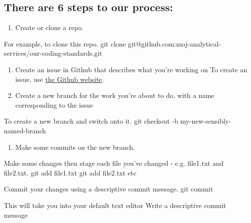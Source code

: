 \documentclass[]{book}
\newenvironment{Shaded}{\begin{snugshade}}{\end{snugshade}}
\newcommand{\ExtensionTok}[1]{#1}
\newcommand{\FunctionTok}[1]{\textcolor[rgb]{0.00,0.00,0.00}{#1}}
\newcommand{\NormalTok}[1]{#1}
\newcommand{\StringTok}[1]{\textcolor[rgb]{0.31,0.60,0.02}{#1}}
\providecommand{\tightlist}{%
  \setlength{\itemsep}{0pt}\setlength{\parskip}{0pt}}
\begin{document}
\hypertarget{there-are-6-steps-to-our-process}{%
\subsection*{There are 6 steps to our process:}\label{there-are-6-steps-to-our-process}}

\begin{enumerate}
\def\labelenumi{\arabic{enumi}.}
\tightlist
\item
  Create or clone a repo.
\end{enumerate}

\begin{Shaded}
\begin{Highlighting}[]
\ExtensionTok{For}\NormalTok{ example, to clone this repo.}
\FunctionTok{git}\NormalTok{ clone git@github.com:moj-analytical-services/our-coding-standards.git}
\end{Highlighting}
\end{Shaded}

\begin{enumerate}
\def\labelenumi{\arabic{enumi}.}
\setcounter{enumi}{1}
\item
  Create an issue in Github that describes what you're working on
  To create an issue, use \href{https://guides.github.com/features/issues/}{the Github website}.
\item
  Create a new branch for the work you're about to do, with a name corresponding to the issue
\end{enumerate}

\begin{Shaded}
\begin{Highlighting}[]
\ExtensionTok{To}\NormalTok{ create a new branch and switch onto it.}
\FunctionTok{git}\NormalTok{ checkout -b my-new-sensibly-named-branch}
\end{Highlighting}
\end{Shaded}

\begin{enumerate}
\def\labelenumi{\arabic{enumi}.}
\setcounter{enumi}{3}
\tightlist
\item
  Make some commits on the new branch.
\end{enumerate}

\begin{Shaded}
\begin{Highlighting}[]
\ExtensionTok{Make}\NormalTok{ some changes then stage each file you}\StringTok{'ve changed - e.g. file1.txt and file2.txt.}
\StringTok{git add file1.txt}
\StringTok{git add file2.txt}
\StringTok{etc}

\StringTok{Commit your changes using a descriptive commit message.}
\StringTok{git commit}

\StringTok{This will take you into your default text editor}
\StringTok{Write a descriptive commit message}
\end{Highlighting}
\end{Shaded}
\end{document}
